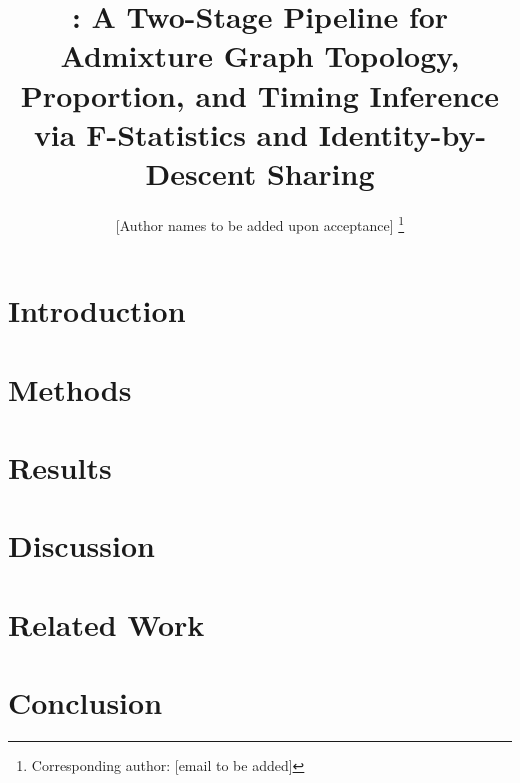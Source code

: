 \documentclass[10pt]{article}
\title{\hapgraph: A Two-Stage Pipeline for Admixture Graph Topology,
       Proportion, and Timing Inference via F-Statistics and
       Identity-by-Descent Sharing}
\author{%
  [Author names to be added upon acceptance]%
  \thanks{Corresponding author: [email to be added]}
}
\date{}
\begin{document}
\maketitle

\begin{abstract}

\end{abstract}

\section{Introduction}


\section{Methods}


\section{Results}


\section{Discussion}


\section{Related Work}


\section{Conclusion}




\end{document}
